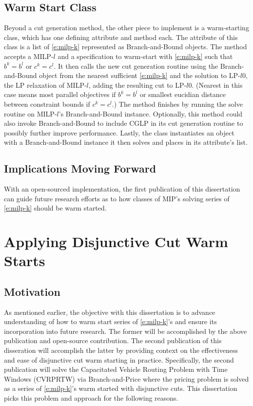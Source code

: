 \documentclass[10pt]{article}
\begin{document}
	\subsection{Warm Start Class} \label{ss:warm_start_class}
	Beyond a cut generation method, the other piece to implement is a warm-starting class, which has one defining attribute and method each. The attribute of this class is a list of \ref{e:milp-k} represented as Branch-and-Bound objects. The method accepts a MILP-$ l $ and a specification to warm-start with \ref{e:milp-k} such that $ b^k = b^l $ or $ c^k = c^l $. It then calls the new cut generation routine using the Branch-and-Bound object from the nearest sufficient \ref{e:milp-k} and the solution to LP-$ l0 $, the LP relaxation of MILP-$ l $, adding the resulting cut to LP-$ l0 $. (Nearest in this case means most parallel objectives if $ b^k = b^l $ or smallest eucidian distance between constraint bounds if $ c^k = c^l $.) The method finishes by running the solve routine on MILP-$ l $'s Branch-and-Bound instance. Optionally, this method could also invoke Branch-and-Bound to include CGLP in its cut generation routine to possibly further improve performance. Lastly, the class instantiates an object with a Branch-and-Bound instance it then solves and places in its attribute's list.
	
	\subsection{Implications Moving Forward} \label{ss:implementation_implications}
	With an open-sourced implementation, the first publication of this dissertation can guide future research efforts as to how classes of MIP's solving series of \ref{e:milp-k} should be warm started.
	
	\section{Applying Disjunctive Cut Warm Starts}
	
	\subsection{Motivation} \label{ss:application_motivation}
	As mentioned earlier, the objective with this dissertation is to advance understanding of how to warm start series of \ref{e:milp-k}'s and ensure its incorporation into future research. The former will be accomplished by the above publication and open-source contribution. The second publication of this disseration will accomplish the latter by providing context on the effectiveness and ease of disjunctive cut warm starting in practice. Specifically, the second publication will solve the Capacitated Vehicle Routing Problem with Time Windows (CVRPRTW) via Branch-and-Price where the pricing problem is solved as a series of \ref{e:milp-k}'s warm started with disjunctive cuts. This dissertation picks this problem and approach for the following reasons.
	
\end{document}
